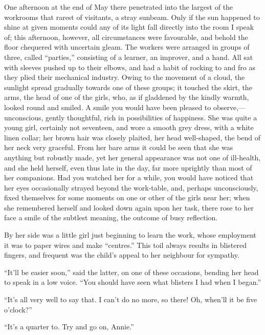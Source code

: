 One afternoon at the end of May there penetrated into the largest of the
workrooms that rarest of visitants, a stray sunbeam. Only if the sun
happened to shine at given moments could any of its light fall directly
into the room I speak of; this afternoon, however, all circumstances
were favourable, and behold the floor chequered with uncertain gleam.
The workers were arranged in groups of three, called ``parties,''
consisting of a learner, an improver, and a hand. All sat with sleeves
pushed up to their elbows, and had a habit of rocking to and fro as they
plied their mechanical industry. Owing to the movement of a cloud, the
sunlight spread gradually towards one of these groups; it touched the
skirt, the arms, the head of one of the girls, who, as if gladdened by
the {}kindly warmth, looked round and smiled. A smile you would have
been pleased to observe,---unconscious, gently thoughtful, rich in
possibilities of happiness. She was quite a young girl, certainly not
seventeen, and wore a smooth grey dress, with a white linen collar; her
brown hair was closely plaited, her head well-shaped, the bend of her
neck very graceful. From her bare arms it could be seen that she was
anything but robustly made, yet her general appearance was not one of
ill-health, and she held herself, even thus late in the day, far more
uprightly than most of her companions. Had you watched her for a while,
you would have noticed that her eyes occasionally strayed beyond the
work-table, and, perhaps unconsciously, fixed themselves for some
moments on one or other of the girls near her; when she remembered
herself and looked down again upon her task, there rose to her face a
smile of the subtlest meaning, the outcome of busy reflection.

By her side was a little girl just beginning to learn the work, whose
employment it was {}to paper wires and make ``centres.'' This toil
always results in blistered fingers, and frequent was the child's appeal
to her neighbour for sympathy.

``It'll be easier soon,'' said the latter, on one of these occasions,
bending her head to speak in a low voice. ``You should have seen what
blisters I had when I began.''

``It's all very well to say that. I can't do no more, so there! Oh,
when'll it be five o'clock?''

``It's a quarter to. Try and go on, Annie.''


